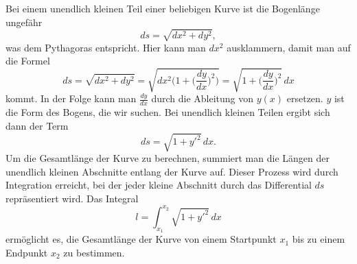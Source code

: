 Bei einem unendlich kleinen Teil einer beliebigen Kurve ist die Bogenlänge ungefähr
\begin{equation}
	ds
	=
	\sqrt{dx^2 + dy^2}
	\label{kettenlinie:equation1},
\end{equation}
was dem Pythagoras entspricht.
%
Hier kann man \(dx^2\) ausklammern, damit man auf die Formel
\begin{equation}
	ds
	=
	\sqrt{dx^2 + dy^2}
	=
	\sqrt{dx^2 \biggl( 1 + \biggl( \frac{dy}{dx} \biggr)^2 \biggr)}
	=
	\sqrt{1 + \biggl( \frac{dy}{dx} \biggr)^2} \, dx
\end{equation}
kommt.
In der Folge kann man \(\frac{dy}{dx}\) durch die Ableitung von \(y(x)\) ersetzen.
\(y\) ist die Form des Bogens, die wir suchen.
Bei unendlich kleinen Teilen ergibt sich dann der Term
\begin{equation}
	ds
	=
	\sqrt{1 + y'^2} \, dx.
\end{equation}
Um die Gesamtlänge der Kurve zu berechnen, summiert man die Längen der unendlich kleinen Abschnitte entlang der Kurve auf.
Dieser Prozess wird durch Integration erreicht, bei der jeder kleine Abschnitt durch das Differential \(ds\) repräsentiert wird.
Das Integral
\begin{equation}
	l
	=
	\int_{x_1}^{x_2} \sqrt{1 + y'^2} \, dx
\end{equation}
ermöglicht es, die Gesamtlänge der Kurve von einem Startpunkt \(x_1\) bis zu einem Endpunkt \(x_2\) zu bestimmen.

